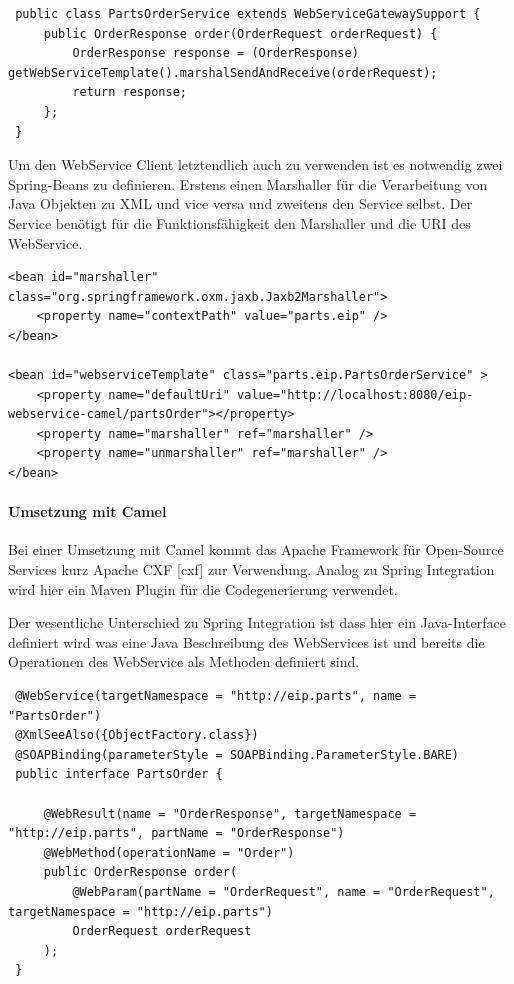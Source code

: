 \documentclass[12pt,a4paper,ngerman]{article}
\begin{document}
\begin{lstlisting}
 public class PartsOrderService extends WebServiceGatewaySupport {
     public OrderResponse order(OrderRequest orderRequest) {
         OrderResponse response = (OrderResponse) getWebServiceTemplate().marshalSendAndReceive(orderRequest);
         return response;
     };
 }
\end{lstlisting}

Um den WebService Client letztendlich auch zu verwenden ist es notwendig
zwei Spring-Beans zu definieren. Erstens einen Marshaller für die
Verarbeitung von Java Objekten zu XML und vice versa und zweitens den
Service selbst. Der Service benötigt für die Funktionsfähigkeit den
Marshaller und die URI des WebService.

\begin{lstlisting}
<bean id="marshaller" class="org.springframework.oxm.jaxb.Jaxb2Marshaller">
    <property name="contextPath" value="parts.eip" />
</bean>

<bean id="webserviceTemplate" class="parts.eip.PartsOrderService" >
    <property name="defaultUri" value="http://localhost:8080/eip-webservice-camel/partsOrder"></property>
    <property name="marshaller" ref="marshaller" />
    <property name="unmarshaller" ref="marshaller" />
</bean>
\end{lstlisting}

\paragraph{Umsetzung mit Camel}

Bei einer Umsetzung mit Camel kommt das Apache Framework für Open-Source
Services kurz Apache CXF {[}cxf{]} zur Verwendung. Analog zu Spring
Integration wird hier ein Maven Plugin für die Codegenerierung
verwendet.

Der wesentliche Unterschied zu Spring Integration ist dass hier ein
Java-Interface definiert wird was eine Java Beschreibung des WebServices
ist und bereits die Operationen des WebService als Methoden definiert
sind.

\begin{lstlisting}
 @WebService(targetNamespace = "http://eip.parts", name = "PartsOrder")
 @XmlSeeAlso({ObjectFactory.class})
 @SOAPBinding(parameterStyle = SOAPBinding.ParameterStyle.BARE)
 public interface PartsOrder {

     @WebResult(name = "OrderResponse", targetNamespace = "http://eip.parts", partName = "OrderResponse")
     @WebMethod(operationName = "Order")
     public OrderResponse order(
         @WebParam(partName = "OrderRequest", name = "OrderRequest", targetNamespace = "http://eip.parts")
         OrderRequest orderRequest
     );
 }
\end{lstlisting}
\end{document}
